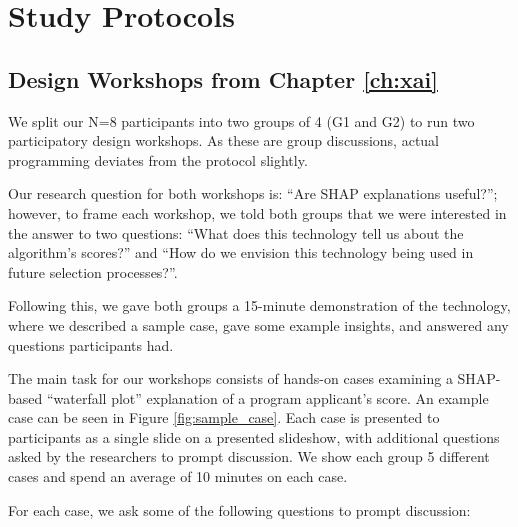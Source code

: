 

\chapter{\label{app:protocolmockup}Study Protocols}

\minitoc

\section{Design Workshops from Chapter \ref{ch:xai}}\label{app:xaiprotocol}
We split our N=8 participants into two groups of 4 (G1 and G2) to run two participatory design workshops. As these are group discussions, actual programming deviates from the protocol slightly.

Our research question for both workshops is: ``Are SHAP explanations useful?''; however, to frame each workshop, we told both groups that we were interested in the answer to two questions: ``What does this technology tell us about the algorithm’s scores?'' and ``How do we envision this technology being used in future selection processes?''.

Following this, we gave both groups a 15-minute demonstration of the technology, where we described a sample case, gave some example insights, and answered any questions participants had. 

The main task for our workshops consists of hands-on cases examining a SHAP-based ``waterfall plot'' explanation of a program applicant's score. An example case can be seen in Figure \ref{fig:sample_case}. Each case is presented to participants as a single slide on a presented slideshow, with additional questions asked by the researchers to prompt discussion. We show each group 5 different cases and spend an average of 10 minutes on each case.

For each case, we ask some of the following questions to prompt discussion:

